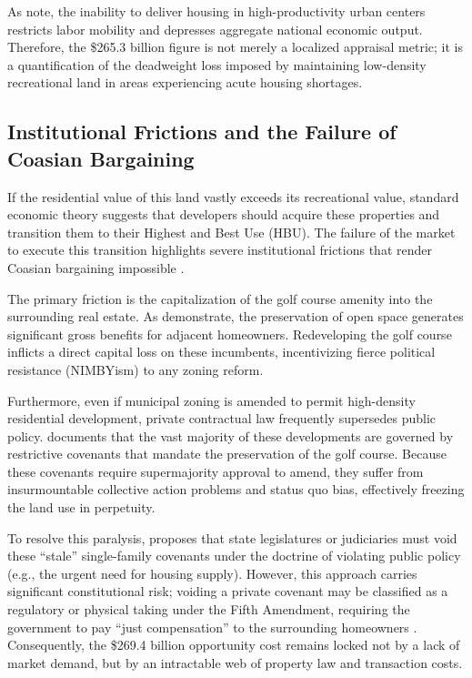 \documentclass[10pt, letterpaper]{article}
\begin{document}
As \textcite{Glaeser2017} note, the inability to deliver housing in high-productivity urban centers restricts labor mobility and depresses aggregate national economic output. Therefore, the \$265.3 billion figure is not merely a localized appraisal metric; it is a quantification of the deadweight loss imposed by maintaining low-density recreational land in areas experiencing acute housing shortages.

\subsection{Institutional Frictions and the Failure of Coasian Bargaining}
If the residential value of this land vastly exceeds its recreational value, standard economic theory suggests that developers should acquire these properties and transition them to their Highest and Best Use (HBU). The failure of the market to execute this transition highlights severe institutional frictions that render Coasian bargaining impossible \parencite{Coase1960}.

The primary friction is the capitalization of the golf course amenity into the surrounding real estate. As \textcite{Cheshire2002} demonstrate, the preservation of open space generates significant gross benefits for adjacent homeowners. Redeveloping the golf course inflicts a direct capital loss on these incumbents, incentivizing fierce political resistance (NIMBYism) to any zoning reform.

Furthermore, even if municipal zoning is amended to permit high-density residential development, private contractual law frequently supersedes public policy. \textcite{Ellickson2022} documents that the vast majority of these developments are governed by restrictive covenants that mandate the preservation of the golf course. Because these covenants require supermajority approval to amend, they suffer from insurmountable collective action problems and status quo bias, effectively freezing the land use in perpetuity. 

To resolve this paralysis, \textcite{Korngold2024} proposes that state legislatures or judiciaries must void these ``stale'' single-family covenants under the doctrine of violating public policy (e.g., the urgent need for housing supply). However, this approach carries significant constitutional risk; voiding a private covenant may be classified as a regulatory or physical taking under the Fifth Amendment, requiring the government to pay ``just compensation'' to the surrounding homeowners \parencite{Korngold2024}. Consequently, the \$269.4 billion opportunity cost remains locked not by a lack of market demand, but by an intractable web of property law and transaction costs.
\end{document}
